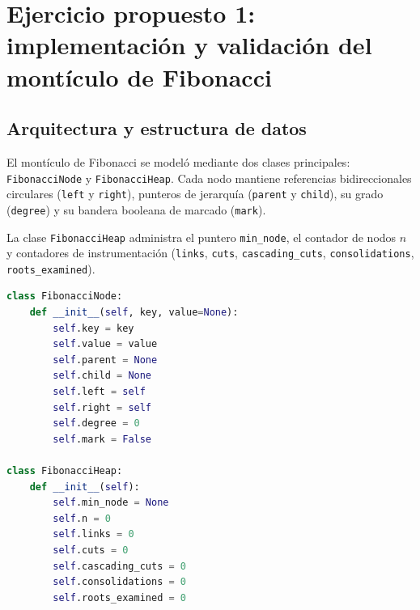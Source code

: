\section{Ejercicio propuesto 1: implementación y validación del montículo de Fibonacci}

\subsection{Arquitectura y estructura de datos}
El montículo de Fibonacci se modeló mediante dos clases principales: \texttt{FibonacciNode} y \texttt{FibonacciHeap}. Cada nodo mantiene referencias bidireccionales circulares (\texttt{left} y \texttt{right}), punteros de jerarquía (\texttt{parent} y \texttt{child}), su grado (\texttt{degree}) y su bandera booleana de marcado (\texttt{mark}).

La clase \texttt{FibonacciHeap} administra el puntero \texttt{min\_node}, el contador de nodos $n$ y contadores de instrumentación (\texttt{links}, \texttt{cuts}, \texttt{cascading\_cuts}, \texttt{consolidations}, \texttt{roots\_examined}).

\begin{lstlisting}[language=Python, caption={Definición formal de la clase FibonacciNode y constructor de FibonacciHeap}, label={lst:fib_clase}]
class FibonacciNode:
    def __init__(self, key, value=None):
        self.key = key
        self.value = value
        self.parent = None
        self.child = None
        self.left = self
        self.right = self
        self.degree = 0
        self.mark = False

class FibonacciHeap:
    def __init__(self):
        self.min_node = None
        self.n = 0
        self.links = 0
        self.cuts = 0
        self.cascading_cuts = 0
        self.consolidations = 0
        self.roots_examined = 0
\end{lstlisting}

